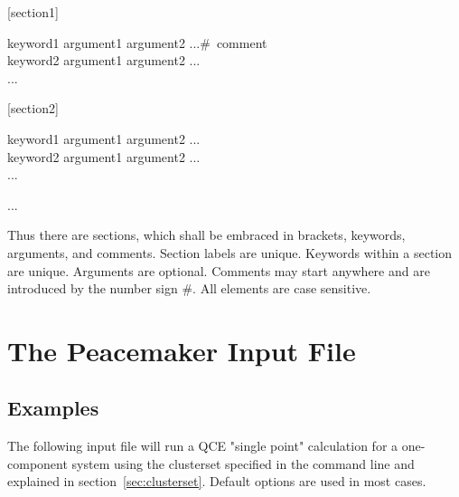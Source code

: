 \documentclass{scrartcl}
\begin{document}
\begin{addmargin}[1cm]{0cm}
    \ttfamily
    \begin{minipage}{\textwidth}
        [section1]
        \begin{addmargin}[1cm]{0cm}
            keyword1 argument1 argument2 ...\#\ comment \\
            keyword2 argument1 argument2 ...\\
            ...
        \end{addmargin}
    \end{minipage}

    \begin{minipage}{\textwidth}
        [section2]
        \begin{addmargin}[1cm]{0cm}
            keyword1 argument1 argument2 ... \\
            keyword2 argument1 argument2 ... \\
            ...
        \end{addmargin}
    \end{minipage}

    \begin{minipage}{\textwidth}
        ...
    \end{minipage}

\end{addmargin}

Thus there are sections, which shall be embraced in brackets, keywords, arguments, and comments.
Section labels are unique.
Keywords within a section are unique.
Arguments are optional.
Comments may start anywhere and are introduced by the number sign \#.
All elements are case sensitive.

\section{The Peacemaker Input File}
\label{sec:input}

\subsection{Examples}

The following input file will run a QCE "single point" calculation for a one-component system using the clusterset specified in the command line and explained in section~\vref{sec:clusterset}.
Default options are used in most cases.

\
\end{document}
